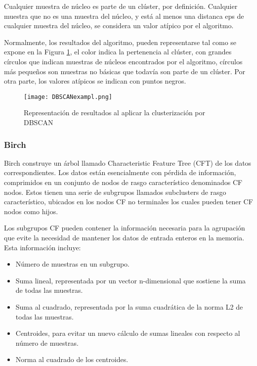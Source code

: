 Cualquier muestra de núcleo es parte de un clúster, por definición. Cualquier muestra que no es una muestra del núcleo, y está al menos una distanca eps de cualquier muestra del núcleo, se considera un valor atípico por el algoritmo.

Normalmente, los resultados del algoritmo, pueden representarse tal como se expone en la Figura  \ref{dbscanE}, el color indica la pertenencia al clúster, con grandes círculos que indican muestras de núcleos encontrados por el algoritmo, círculos más pequeños son muestras no básicas que todavía son parte de un clúster. Por otra parte, los valores atípicos se indican con puntos negros.

\begin{figure}[!h]
	\centering
	\texttt{[image: DBSCANexampl.png]}
	\caption{Representación de resultados al aplicar la clusterización por DBSCAN}
	\label{dbscanE}
\end{figure}

\subsubsection{Birch}

Birch construye un árbol llamado Characteristic Feature Tree (CFT) de los datos correspondientes. Los datos están esencialmente con pérdida de información, comprimidos en un conjunto de nodos de rasgo característico denominados CF nodos. Estos tienen una serie de subgrupos llamados subclusters de rasgo característico, ubicados en los nodos CF no terminales los cuales pueden tener CF nodos como hijos.

Los subgrupos CF pueden contener la información necesaria para la agrupación que evite la necesidad de mantener los datos de entrada enteros en la memoria. Esta información incluye:

\begin{itemize}
	
	
	\item Número de muestras en un subgrupo.
	\item Suma lineal, representada por un vector n-dimensional que sostiene la suma de todas las muestras.
	\item Suma al cuadrado, representada por la suma cuadrática de la norma L2 de todas las muestras.
	\item Centroides, para evitar un nuevo cálculo de sumas lineales con respecto al número de muestras.
	\item Norma al cuadrado de los centroides.
	
\end{itemize}


